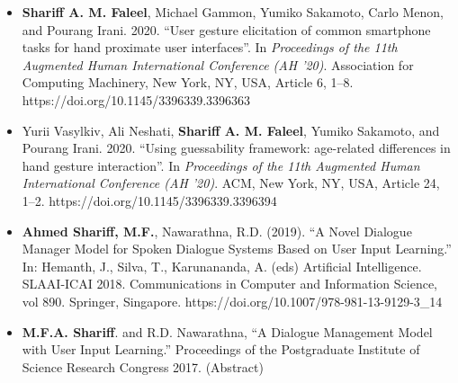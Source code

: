 \documentclass[a4paper,9.5pt]{article}
\begin{document}
\begin{itemize}
  \item[]\textbf{Shariff A. M. Faleel}, Michael Gammon, Yumiko Sakamoto, Carlo Menon, and Pourang Irani. 2020. ``User gesture elicitation of common smartphone tasks for hand proximate user interfaces''. In \textit{Proceedings of the 11th Augmented Human International Conference (AH '20)}. Association for Computing Machinery, New York, NY, USA, Article 6, 1–8. \\https://doi.org/10.1145/3396339.3396363
  \item[]Yurii Vasylkiv, Ali Neshati, \textbf{Shariff A. M. Faleel}, Yumiko Sakamoto, and Pourang Irani. 2020. ``Using guessability framework: age-related differences in hand gesture interaction''. In \textit{Proceedings of the 11th Augmented Human International Conference (AH '20)}. ACM, New York, NY, USA, Article 24, 1–2. https://doi.org/10.1145/3396339.3396394
  \item[]\textbf{Ahmed Shariff, M.F.}, Nawarathna, R.D. (2019). ``A Novel Dialogue Manager Model for Spoken Dialogue Systems Based on User Input Learning.'' In: Hemanth, J., Silva, T., Karunananda, A. (eds) Artificial Intelligence. SLAAI-ICAI 2018. Communications in Computer and Information Science, vol 890. Springer, Singapore. https://doi.org/10.1007/978-981-13-9129-3\_14
  \item[]\textbf{M.F.A. Shariff}. and R.D. Nawarathna, ``A Dialogue Management Model with User Input Learning.'' Proceedings of the Postgraduate Institute of Science Research Congress 2017. (Abstract)
\end{itemize}


\end{document}
